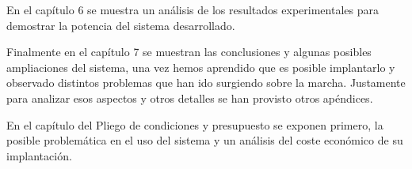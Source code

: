 En el capítulo 6 se muestra un análisis de los resultados experimentales para demostrar la potencia del sistema desarrollado.
 
Finalmente en el capítulo 7 se muestran las conclusiones y algunas posibles ampliaciones del sistema, una vez hemos aprendido que es posible implantarlo y observado distintos problemas que han ido surgiendo sobre la marcha. Justamente para analizar esos aspectos y otros detalles se han provisto otros apéndices.

En el capítulo del Pliego de condiciones y presupuesto se exponen primero, la posible problemática en el uso del sistema y un análisis del coste económico de su implantación.